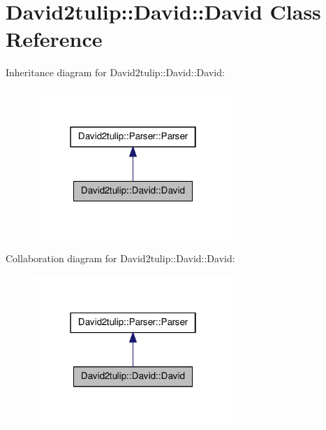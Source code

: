\hypertarget{classDavid2tulip_1_1David_1_1David}{
\section{\-David2tulip\-:\-:\-David\-:\-:\-David \-Class \-Reference}
\label{classDavid2tulip_1_1David_1_1David}
}


\-Inheritance diagram for \-David2tulip\-:\-:\-David\-:\-:\-David\-:\nopagebreak
\begin{figure}[H]
\begin{center}
\leavevmode
\includegraphics[width=214pt]{classDavid2tulip_1_1David_1_1David__inherit__graph}
\end{center}
\end{figure}


\-Collaboration diagram for \-David2tulip\-:\-:\-David\-:\-:\-David\-:\nopagebreak
\begin{figure}[H]
\begin{center}
\leavevmode
\includegraphics[width=214pt]{classDavid2tulip_1_1David_1_1David__coll__graph}
\end{center}
\end{figure}
